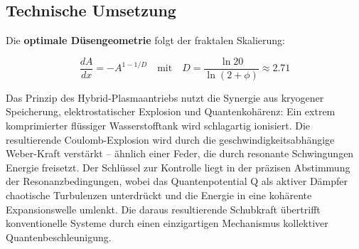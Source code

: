 \subsection{Technische Umsetzung}
\label{subsec:tech}

Die \textbf{optimale Düsengeometrie} folgt der fraktalen Skalierung:

\begin{equation}
\frac{dA}{dx} = -A^{1-1/D} \quad \text{mit} \quad D = \frac{\ln 20}{\ln(2+\phi)} \approx 2.71
\label{eq:duese}
\end{equation}

Das Prinzip des Hybrid-Plasmaantriebs nutzt die Synergie aus kryogener Speicherung, elektrostatischer Explosion und Quantenkohärenz: Ein extrem komprimierter flüssiger Wasserstofftank wird schlagartig
ionisiert. Die resultierende Coulomb-Explosion wird durch die geschwindigkeitsabhängige Weber-Kraft verstärkt – ähnlich einer Feder, die durch resonante Schwingungen Energie freisetzt. Der Schlüssel
zur Kontrolle liegt in der präzisen Abstimmung der Resonanzbedingungen, wobei das Quantenpotential Q als aktiver Dämpfer chaotische Turbulenzen unterdrückt und die Energie in eine kohärente
Expansionswelle umlenkt. Die daraus resultierende Schubkraft übertrifft konventionelle Systeme durch einen einzigartigen Mechanismus kollektiver Quantenbeschleunigung.
